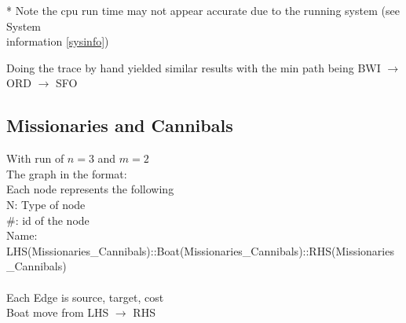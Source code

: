 \documentclass[12pt]{article}
\begin{document}
* Note the cpu run time may not appear accurate due to the running system (see System \\ information \ref{sysinfo})

Doing the trace by hand yielded similar results with the min path being BWI $\to$ ORD  $\to$ SFO

\subsection{Missionaries and Cannibals}
With run of $n=3$ and $m=2$ \\
The graph in the format:\\
Each node represents the following\\

N: Type of node\\

\#: id of the node\\

Name: LHS(Missionaries\_Cannibals)::Boat(Missionaries\_Cannibals)::RHS(Missionaries\_Cannibals)\\
\\
Each Edge is source, target, cost\\
Boat move from LHS $\to$ RHS
\end{document}
